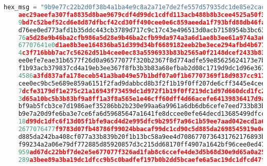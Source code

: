 \documentclass[11pt, nopagenumbers]{adamblan-hw}
\begin{document}
\begin{lstlisting}[language=Python]
    hex_msg = "9b9e77c22b2d0f38b4a1ba4e9c8a2a71e7de2fe557d57935dc1de85e2cac49389 \\
    aec29aeefa307fa8835d8bae9679cdf4d99dc1cdfd113acb488b8b3cee4525a50f39a5fbabe8 \\
    9bd7c52bef52cd6e8d87dfbcf42cd30ff490cee0e6c859aeeda1f793bfd88db46fa56e22cb64 \\
    d76ee0ed773afd1b35ddc443cb3789d717c9c17c43e496513d0acb7158954b3bc635d74b6770 \\
    76a5d28e9b46ba2cfb986a5d28e9b46ba2cfb99da974a3a6d1ae8b3ee61a974a3a6d1ae8b3ee \\
    67707641e0d1ae8b3ee164836ba51d399d34bf6689182eeb2be3ece294afbd4b677077eae31b \\
    4c3f716bbb7ac7c56262d51b4cee0ec83a5596933b83b2565a0f2148dcef2433b83b26e947ca \\
    ee0efe7eae31b6577f26d0a96577077f320b2367f8d774adfe59e85625624173e7b9565a6577 \\
    f1b93acb379837cd4a19eb3ee367f8fb3b3b83a68efbab2d08c1719d9dc1d96e367a1647cb5c \\
    4586a3fd837afa178eceb541a3ba049e57b1bdf07a0f1b67707369f18d9837cc9179767afad0 \\
    cee0ec9bc5e689e859a6151f2fad9dabbcd8b3f2f1b19f0ff207de6cff3445e4cee0e9b33de3 \\
    7dcfe3179df1e275c21a16943f73459dc1d972f1b19f0ff219dc1d97d660dcd1fc29e8565a1a \\
    3d65a10bc5b3b83bf9a8ff1a3f8a565e1e46cff60dff4d66acefe64139836417d9a225733b83 \\
    bf9ab5fcb3ce7d1986aef35286bb2b230e99aa6a9961a6db6db6cefe7eed733b83bf5718d9a1 \\
    b9e7a20d9fe6ba3e7ce6fa6d59685647a1641fe8dccee0efe64decd13685499dfcc9bd9a3f57 \\
    18d99dc1dfc6f13d05f1bfe9acd4d2e995dfc9b295f7a96c1b59ee7aad042ecd1a6151f2faaf \\
    2677076477f9783d07fb48786f99024bbacaf99dc1cd90c5d885da2698545919e0ef46bbd0c5 \\
    d885da242ba408cf077a33b839b20f1b13bc58a9ee4d7086770736431762176893bd297a5b06 \\
    f99234a2a06e79df772885d85920857d3c215dd68170ff4907a1642bf96cee0ed47f845504ee \\
    959ad67dc22bbf7de2e5e677077f326ad1fab8c6ccefe4de3d5b68d30e9d65a0a25f47cb3c2f \\
    289a3bee89a3ba19dc1dfcc9b5c0badfef197b0b2dd5bcaefe6a5ac19dc1dfcd47f8d1eb2d0f \\

\end{lstlisting}
\end{document}
